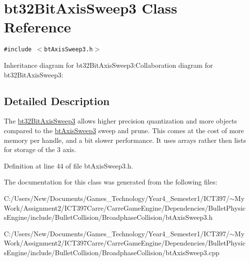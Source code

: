 \hypertarget{classbt32_bit_axis_sweep3}{
\section{bt32BitAxisSweep3 Class Reference}
\label{classbt32_bit_axis_sweep3}
}
{\tt \#include $<$btAxisSweep3.h$>$}

Inheritance diagram for bt32BitAxisSweep3:Collaboration diagram for bt32BitAxisSweep3:

\subsection{Detailed Description}
The \hyperlink{classbt32_bit_axis_sweep3}{bt32BitAxisSweep3} allows higher precision quantization and more objects compared to the \hyperlink{classbt_axis_sweep3}{btAxisSweep3} sweep and prune. This comes at the cost of more memory per handle, and a bit slower performance. It uses arrays rather then lists for storage of the 3 axis. 

Definition at line 44 of file btAxisSweep3.h.

The documentation for this class was generated from the following files:\begin{CompactItemize}
\item 
C:/Users/New/Documents/Games\_\-Technology/Year4\_\-Semester1/ICT397/$\sim$My Work/Assignment2/ICT397Carre/CarreGameEngine/Dependencies/BulletPhysicsEngine/include/BulletCollision/BroadphaseCollision/btAxisSweep3.h\item 
C:/Users/New/Documents/Games\_\-Technology/Year4\_\-Semester1/ICT397/$\sim$My Work/Assignment2/ICT397Carre/CarreGameEngine/Dependencies/BulletPhysicsEngine/include/BulletCollision/BroadphaseCollision/btAxisSweep3.cpp\end{CompactItemize}

